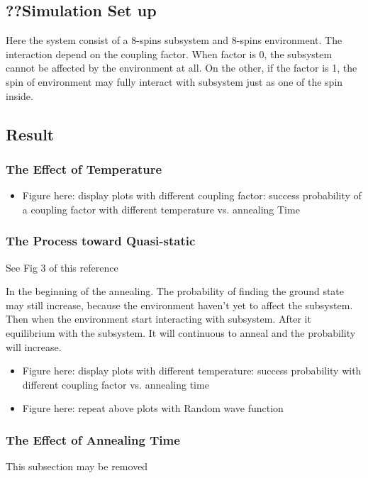 \documentclass[twoside,a4paper,article]{combine}
\begin{document}
\subsection{??Simulation Set up}
	Here the system consist of a 8-spins subsystem and 8-spins environment. The interaction depend on the coupling factor. When factor is 0, the subsystem cannot be affected by the environment at all. On the other, if the factor is 1, the spin of environment may fully interact with subsystem just as one of the spin inside.

\subsection{Result}
\subsubsection{The Effect of Temperature}
	\begin{itemize}
		\item Figure here: display plots with different coupling factor: success probability of a coupling factor with different temperature vs. annealing Time
	\end{itemize}
\subsubsection{The Process toward Quasi-static}
	See Fig 3 of this reference	\cite{Amin2015} 
	
	In the beginning of the annealing. The probability of finding the ground state may still increase, because the environment haven't yet to affect the subsystem. Then when the environment start interacting with subsystem. After it equilibrium with the subsystem. It will continuous to anneal and the probability will increase. 
	\begin{itemize}
		\item \checkmark Figure here: display plots with different temperature: success probability with different coupling factor vs. annealing time
		
		\item \checkmark Figure here: repeat above plots with Random wave function
	\end{itemize}
	
	
\subsubsection{The Effect of Annealing Time}
	This subsection may be removed 
\end{document}
